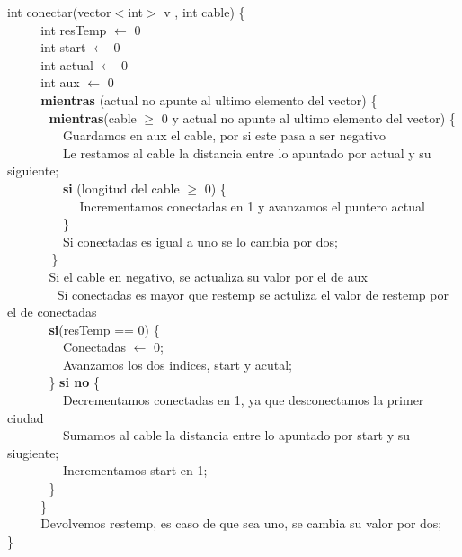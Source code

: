 int conectar(vector$<$int$>$ v , int cable) \{ \\
$~~~~~~~~~~~~$int resTemp $\leftarrow$ 0 \\
$~~~~~~~~~~~~$int start $\leftarrow$ 0 \\
$~~~~~~~~~~~~$int actual $\leftarrow$ 0 \\
$~~~~~~~~~~~~$int aux $\leftarrow$ 0 \\
$~~~~~~~~~~~~$\textbf{mientras} (actual no apunte al ultimo elemento del vector) \{    \\
$~~~~~~~~~~~~~~~$\textbf{mientras}(cable $\geq$ 0 y actual no apunte al ultimo elemento del vector) \{   \\
$~~~~~~~~~~~~~~~~~~~~$Guardamos en aux el cable, por si este pasa a ser negativo \\
$~~~~~~~~~~~~~~~~~~~~$Le restamos al cable la distancia entre lo apuntado por actual y su siguiente; \\
$~~~~~~~~~~~~~~~~~~~~$\textbf{si} (longitud del cable $\geq$ 0) \{  \\
$~~~~~~~~~~~~~~~~~~~~~~~~~~$Incrementamos conectadas en 1 y avanzamos el puntero actual 
$~~~~~~~~~~~~~~~~~~~~$\} \\
$~~~~~~~~~~~~~~~~~~~~$Si conectadas es igual a uno se lo cambia por dos;  \\
$~~~~~~~~~~~~~~~~$\}\\
$~~~~~~~~~~~~~~~$Si el cable en negativo, se actualiza su valor por el de aux\\
$~~~~~~~~~~~~~~~~~~$Si conectadas es mayor que restemp se actuliza el valor de restemp por el de conectadas\\
$~~~~~~~~~~~~~~~$\textbf{si}(resTemp == 0) \{   \\
$~~~~~~~~~~~~~~~~~~~~$Conectadas  $\leftarrow$ 0; \\
$~~~~~~~~~~~~~~~~~~~~$Avanzamos los dos indices, start y acutal;  \\
$~~~~~~~~~~~~~~~$\} \textbf{si no} \{ \\
$~~~~~~~~~~~~~~~~~~~~$Decrementamos conectadas en 1, ya que desconectamos la primer ciudad \\
$~~~~~~~~~~~~~~~~~~~~$Sumamos al cable la distancia entre lo apuntado por start y su siugiente;\\
$~~~~~~~~~~~~~~~~~~~~$Incrementamos start en 1;  \\
$~~~~~~~~~~~~~~~$\} \\
$~~~~~~~~~~~~$\} \\
$~~~~~~~~~~~~$Devolvemos restemp, es caso de que sea uno, se cambia su valor por dos;  \\
\}\\

